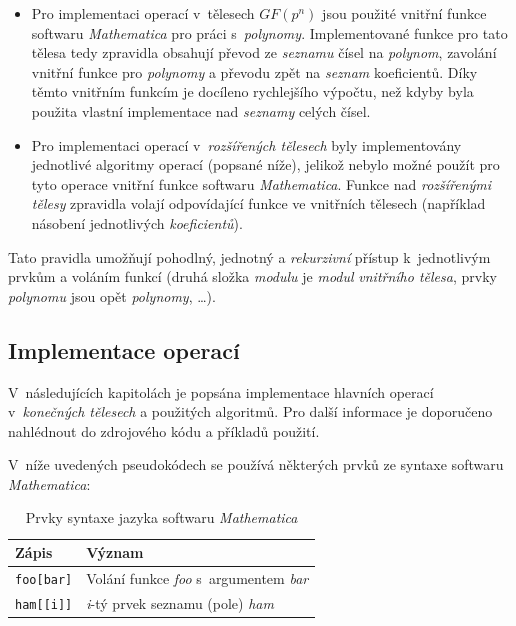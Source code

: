 \documentclass[thesis=M,czech,hidelinks]{FITthesis}[2012/06/26]
\newcommand{\0}{{\textcolor[gray]{0.80}{0}}}
\begin{document}
\begin{itemize}
    \item Pro implementaci operací v~tělesech $GF(p^n)$
        jsou použité vnitřní funkce softwaru \emph{Mathematica} pro práci
        s~\emph{polynomy}. Implementované funkce pro tato tělesa tedy
        zpravidla obsahují převod ze \emph{seznamu} čísel na \emph{polynom},
        zavolání vnitřní funkce pro \emph{polynomy} a převodu zpět na
        \emph{seznam} koeficientů. Díky těmto vnitřním funkcím je docíleno
        rychlejšího výpočtu, než kdyby byla použita vlastní implementace nad
        \emph{seznamy} celých čísel.

    \item Pro implementaci operací v~\emph{rozšířených tělesech} byly
        implementovány jednotlivé algoritmy operací (popsané níže), jelikož
        nebylo možné použít pro tyto operace vnitřní funkce softwaru
        \emph{Mathematica}. Funkce nad \emph{rozšířenými tělesy} zpravidla
        volají odpovídající funkce ve vnitřních tělesech (například násobení
        jednotlivých \emph{koeficientů}).

\end{itemize}

Tato pravidla umožňují pohodlný, jednotný a \emph{rekurzivní} přístup
k~jednotlivým prvkům a voláním funkcí (druhá složka \emph{modulu} je
\emph{modul} \emph{vnitřního tělesa}, prvky \emph{polynomu} jsou opět
\emph{polynomy}, \ldots).

\subsection{Implementace operací}
V~následujících kapitolách je popsána implementace hlavních operací
v~\emph{konečných tělesech} a použitých algoritmů. Pro další informace je
doporučeno nahlédnout do zdrojového kódu a příkladů použití.

V~níže uvedených pseudokódech se používá některých prvků ze syntaxe softwaru
\emph{Mathematica}:

\begin{table}[!ht]
    \centering
    \begin{tabular}{l  l}
        Zápis               & Význam                                            \\
        \hline
        \texttt{foo[bar]}   & Volání funkce \emph{foo} s~argumentem \emph{bar}  \\
        \texttt{ham[[i]]}   & \emph{i}-tý prvek seznamu (pole) \emph{ham}       \\
    \end{tabular}
    \caption{Prvky syntaxe jazyka softwaru \emph{Mathematica}}
\end{table}
\end{document}
